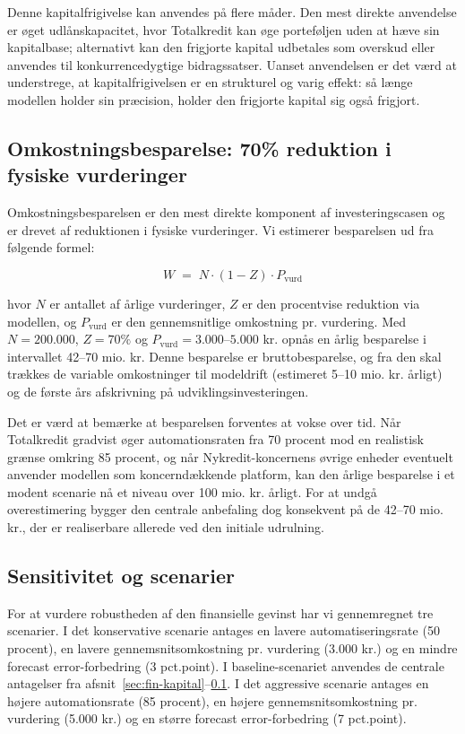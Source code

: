 \documentclass[12pt]{article}
\begin{document}
Denne kapitalfrigivelse kan anvendes på flere måder. Den mest direkte anvendelse er øget udlånskapacitet, hvor Totalkredit kan øge porteføljen uden at hæve sin kapitalbase; alternativt kan den frigjorte kapital udbetales som overskud eller anvendes til konkurrencedygtige bidragssatser. Uanset anvendelsen er det værd at understrege, at kapitalfrigivelsen er en strukturel og varig effekt: så længe modellen holder sin præcision, holder den frigjorte kapital sig også frigjort.

\subsection{Omkostningsbesparelse: 70\% reduktion i fysiske vurderinger}
\label{sec:fin-omk}
Omkostningsbesparelsen er den mest direkte komponent af investeringscasen og er drevet af reduktionen i fysiske vurderinger. Vi estimerer besparelsen ud fra følgende formel:

\begin{equation}
W \;=\; N \cdot (1 - Z) \cdot P_{\text{vurd}}
\label{eq:omk}
\end{equation}

hvor $N$ er antallet af årlige vurderinger, $Z$ er den procentvise reduktion via modellen, og $P_{\text{vurd}}$ er den gennemsnitlige omkostning pr. vurdering. Med $N=200.000$, $Z=70\%$ og $P_{\text{vurd}}=3.000\text{--}5.000$ kr. opnås en årlig besparelse i intervallet 42--70 mio. kr. Denne besparelse er bruttobesparelse, og fra den skal trækkes de variable omkostninger til modeldrift (estimeret 5--10 mio. kr. årligt) og de første års afskrivning på udviklingsinvesteringen.

Det er værd at bemærke at besparelsen forventes at vokse over tid. Når Totalkredit gradvist øger automationsraten fra 70 procent mod en realistisk grænse omkring 85 procent, og når Nykredit-koncernens øvrige enheder eventuelt anvender modellen som koncerndækkende platform, kan den årlige besparelse i et modent scenarie nå et niveau over 100 mio. kr. årligt. For at undgå overestimering bygger den centrale anbefaling dog konsekvent på de 42--70 mio. kr., der er realiserbare allerede ved den initiale udrulning.

\subsection{Sensitivitet og scenarier}
\label{sec:fin-sens}
For at vurdere robustheden af den finansielle gevinst har vi gennemregnet tre scenarier. I det konservative scenarie antages en lavere automatiseringsrate (50 procent), en lavere gennemsnitsomkostning pr. vurdering (3.000 kr.) og en mindre forecast error-forbedring (3 pct.point). I baseline-scenariet anvendes de centrale antagelser fra afsnit~\ref{sec:fin-kapital}--\ref{sec:fin-omk}. I det aggressive scenarie antages en højere automationsrate (85 procent), en højere gennemsnitsomkostning pr. vurdering (5.000 kr.) og en større forecast error-forbedring (7 pct.point).
\end{document}
